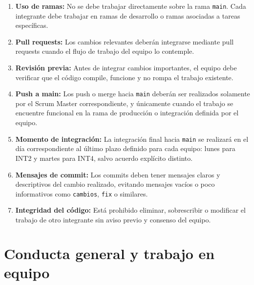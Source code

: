 \documentclass[12pt,a4paper]{article}
\begin{document}
\begin{enumerate}
    \item \textbf{Uso de ramas:} No se debe trabajar directamente sobre la rama \texttt{main}. Cada integrante debe trabajar en ramas de desarrollo o ramas asociadas a tareas específicas.

    \item \textbf{Pull requests:} Los cambios relevantes deberán integrarse mediante pull requests cuando el flujo de trabajo del equipo lo contemple.

    \item \textbf{Revisión previa:} Antes de integrar cambios importantes, el equipo debe verificar que el código compile, funcione y no rompa el trabajo existente.

    \item \textbf{Push a main:} Los push o merge hacia \texttt{main} deberán ser realizados solamente por el Scrum Master correspondiente, y únicamente cuando el trabajo se encuentre funcional en la rama de producción o integración definida por el equipo.

    \item \textbf{Momento de integración:} La integración final hacia \texttt{main} se realizará en el día correspondiente al último plazo definido para cada equipo: lunes para INT2 y martes para INT4, salvo acuerdo explícito distinto.

    \item \textbf{Mensajes de commit:} Los commits deben tener mensajes claros y descriptivos del cambio realizado, evitando mensajes vacíos o poco informativos como \texttt{cambios}, \texttt{fix} o similares.

    \item \textbf{Integridad del código:} Está prohibido eliminar, sobrescribir o modificar el trabajo de otro integrante sin aviso previo y consenso del equipo.
\end{enumerate}

\section{Conducta general y trabajo en equipo}
\end{document}
